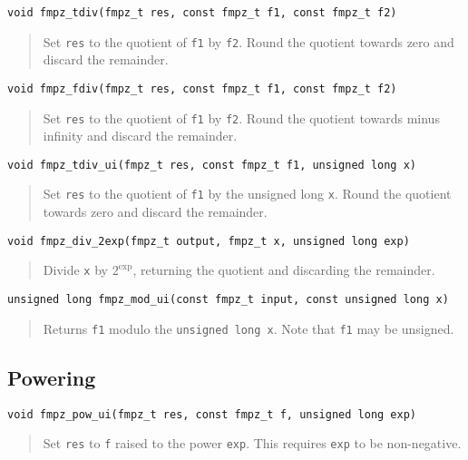 \documentclass[a4paper,10pt]{article}
\newcommand{\code}{\lstinline}
\begin{document}
\begin{lstlisting}
void fmpz_tdiv(fmpz_t res, const fmpz_t f1, const fmpz_t f2)
\end{lstlisting}
\begin{quote}
Set \code{res} to the quotient of \code{f1} by \code{f2}. Round the quotient towards zero and discard the remainder.
\end{quote}

\begin{lstlisting}
void fmpz_fdiv(fmpz_t res, const fmpz_t f1, const fmpz_t f2)
\end{lstlisting}
\begin{quote}
Set \code{res} to the quotient of \code{f1} by \code{f2}. Round the quotient towards minus infinity and discard the remainder.
\end{quote}

\begin{lstlisting}
void fmpz_tdiv_ui(fmpz_t res, const fmpz_t f1, unsigned long x)
\end{lstlisting}
\begin{quote}
Set \code{res} to the quotient of \code{f1} by the unsigned long \code{x}. Round the quotient towards zero and discard the remainder.
\end{quote}

\begin{lstlisting}
void fmpz_div_2exp(fmpz_t output, fmpz_t x, unsigned long exp)
\end{lstlisting}
\begin{quote}
Divide \code{x} by $2^{\mbox{exp}}$, returning the quotient and discarding the remainder.
\end{quote}

\begin{lstlisting}
unsigned long fmpz_mod_ui(const fmpz_t input, const unsigned long x)
\end{lstlisting}
\begin{quote}
Returns \code{f1} modulo the \code{unsigned long x}. Note that \code{f1} may be unsigned. 
\end{quote}

\subsection{Powering}

\begin{lstlisting}
void fmpz_pow_ui(fmpz_t res, const fmpz_t f, unsigned long exp)
\end{lstlisting}
\begin{quote}
Set \code{res} to \code{f} raised to the power \code{exp}. This requires \code{exp} to be non-negative.
\end{quote}
\end{document}
